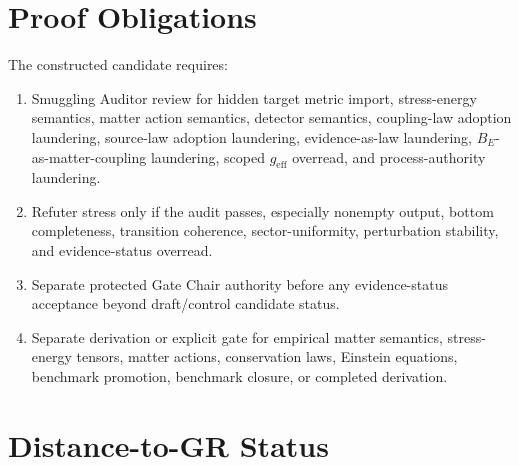 \documentclass[11pt]{article}
\newcommand{\geff}{g_{\mathrm{eff}}}
\begin{document}
\section{Proof Obligations}

The constructed candidate requires:
\begin{enumerate}[leftmargin=*]
  \item Smuggling Auditor review for hidden target metric import,
  stress-energy semantics, matter action semantics, detector semantics,
  coupling-law adoption laundering, source-law adoption laundering,
  evidence-as-law laundering, \(B_E\)-as-matter-coupling laundering, scoped
  \(\geff\) overread, and process-authority laundering.
  \item Refuter stress only if the audit passes, especially nonempty output,
  bottom completeness, transition coherence, sector-uniformity, perturbation
  stability, and evidence-status overread.
  \item Separate protected Gate Chair authority before any evidence-status
  acceptance beyond draft/control candidate status.
  \item Separate derivation or explicit gate for empirical matter semantics,
  stress-energy tensors, matter actions, conservation laws, Einstein
  equations, benchmark promotion, benchmark closure, or completed derivation.
\end{enumerate}

\section{Distance-to-GR Status}
\end{document}
